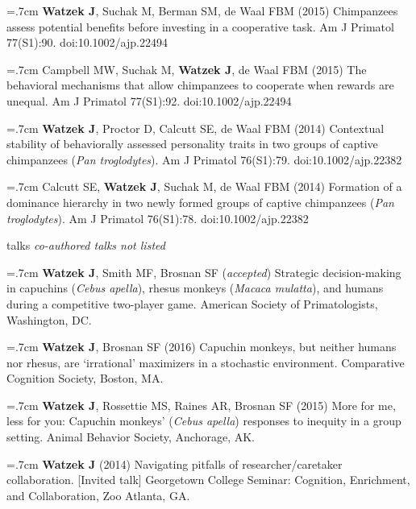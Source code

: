 \documentclass[]{friggeri-cv}
\begin{document}
\hangindent=.7cm \textbf{Watzek J}, Suchak M, Berman SM, de Waal FBM (2015) Chimpanzees assess potential benefits before investing in a cooperative task. Am J Primatol 77(S1):90. doi:10.1002/ajp.22494

\hangindent=.7cm Campbell MW, Suchak M, \textbf{Watzek J}, de Waal FBM (2015) The behavioral mechanisms that allow chimpanzees to cooperate when rewards are unequal. Am J Primatol 77(S1):92. doi:10.1002/ajp.22494

\hangindent=.7cm \textbf{Watzek J}, Proctor D, Calcutt SE, de Waal FBM (2014) Contextual stability of behaviorally assessed personality traits in two groups of captive chimpanzees (\emph{Pan troglodytes}). Am J Primatol 76(S1):79. doi:10.1002/ajp.22382

\hangindent=.7cm Calcutt SE, \textbf{Watzek J}, Suchak M, de Waal FBM (2014) Formation of a dominance hierarchy in two newly formed groups of captive chimpanzees (\emph{Pan troglodytes}). Am J Primatol 76(S1):78. doi:10.1002/ajp.22382\\[-.1cm]


\newpage
\thispagestyle{fancy}


{\subfont\large{} talks}
% 
\hspace{.35cm} {\small{} \emph{co-authored talks not listed}} %

\hangindent=.7cm \textbf{Watzek J}, Smith MF, Brosnan SF (\emph{accepted}) Strategic decision-making in capuchins (\emph{Cebus apella}), rhesus monkeys (\emph{Macaca mulatta}), and humans during a competitive two-player game. American Society of Primatologists, Washington, DC.

\hangindent=.7cm \textbf{Watzek J}, Brosnan SF (2016) Capuchin monkeys, but neither humans nor rhesus, are `irrational' maximizers in a stochastic environment. Comparative Cognition Society, Boston, MA.

\hangindent=.7cm \textbf{Watzek J}, Rossettie MS, Raines AR, Brosnan SF (2015) More for me, less for you: Capuchin monkeys' (\emph{Cebus apella}) responses to inequity in a group setting. Animal Behavior Society, Anchorage, AK.

\hangindent=.7cm \textbf{Watzek J} (2014) Navigating pitfalls of researcher/caretaker collaboration. [Invited talk] Georgetown College Seminar: Cognition, Enrichment, and Collaboration, Zoo Atlanta, GA.\\[-.1cm]
\end{document}

